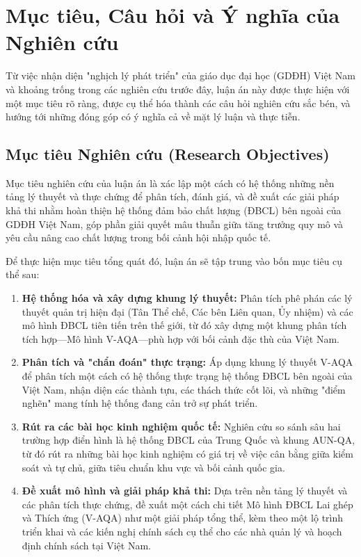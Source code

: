 \documentclass[12pt, a4paper, openany]{report}
\begin{document}

\section{Mục tiêu, Câu hỏi và Ý nghĩa của Nghiên cứu}
\label{sec:muc_tieu_y_nghia}

Từ việc nhận diện "nghịch lý phát triển" của giáo dục đại học (GDĐH) Việt Nam và khoảng trống trong các nghiên cứu trước đây, luận án này được thực hiện với một mục tiêu rõ ràng, được cụ thể hóa thành các câu hỏi nghiên cứu sắc bén, và hướng tới những đóng góp có ý nghĩa cả về mặt lý luận và thực tiễn.

\subsection{Mục tiêu Nghiên cứu (Research Objectives)}
\label{subsec:muc_tieu_nghien_cuu}

Mục tiêu nghiên cứu của luận án là xác lập một cách có hệ thống những nền tảng lý thuyết và thực chứng để phân tích, đánh giá, và đề xuất các giải pháp khả thi nhằm hoàn thiện hệ thống đảm bảo chất lượng (ĐBCL) bên ngoài của GDĐH Việt Nam, góp phần giải quyết mâu thuẫn giữa tăng trưởng quy mô và yêu cầu nâng cao chất lượng trong bối cảnh hội nhập quốc tế.

Để thực hiện mục tiêu tổng quát đó, luận án sẽ tập trung vào bốn mục tiêu cụ thể sau:
\begin{enumerate}
    \item \textbf{Hệ thống hóa và xây dựng khung lý thuyết:} Phân tích phê phán các lý thuyết quản trị hiện đại (Tân Thể chế, Các bên Liên quan, Ủy nhiệm) và các mô hình ĐBCL tiên tiến trên thế giới, từ đó xây dựng một khung phân tích tích hợp—Mô hình V-AQA—phù hợp với bối cảnh đặc thù của Việt Nam.
    
    \item \textbf{Phân tích và "chẩn đoán" thực trạng:} Áp dụng khung lý thuyết V-AQA để phân tích một cách có hệ thống thực trạng hệ thống ĐBCL bên ngoài của Việt Nam, nhận diện các thành tựu, các thách thức cốt lõi, và những "điểm nghẽn" mang tính hệ thống đang cản trở sự phát triển.
    
    \item \textbf{Rút ra các bài học kinh nghiệm quốc tế:} Nghiên cứu so sánh sâu hai trường hợp điển hình là hệ thống ĐBCL của Trung Quốc và khung AUN-QA, từ đó rút ra những bài học kinh nghiệm có giá trị về việc cân bằng giữa kiểm soát và tự chủ, giữa tiêu chuẩn khu vực và bối cảnh quốc gia.
    
    \item \textbf{Đề xuất mô hình và giải pháp khả thi:} Dựa trên nền tảng lý thuyết và các phân tích thực chứng, đề xuất một cách chi tiết Mô hình ĐBCL Lai ghép và Thích ứng (V-AQA) như một giải pháp tổng thể, kèm theo một lộ trình triển khai và các kiến nghị chính sách cụ thể cho các nhà quản lý và hoạch định chính sách tại Việt Nam.
\end{enumerate}
\end{document}
